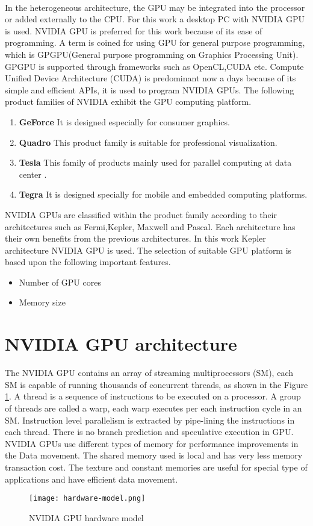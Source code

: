 \paragraph*{} In the heterogeneous architecture, the GPU may be integrated into the processor or added externally to the CPU. For this work a desktop PC with NVIDIA GPU is used. NVIDIA GPU is preferred for this work because of its ease of programming. A term is coined for using GPU for general purpose programming, which is GPGPU(General purpose programming on Graphics Processing Unit). GPGPU is supported through frameworks such as OpenCL,CUDA etc. Compute Unified Device Architecture (CUDA) is predominant now a days because of its simple and efficient APIs, it is used to program NVIDIA GPUs. The following product families of NVIDIA exhibit the GPU computing platform.
\begin{enumerate} 
\item \textbf{GeForce} \hfill \break It is designed especially for consumer graphics.
\item \textbf{Quadro} \hfill \break This product family is suitable for professional visualization.
\item \textbf{Tesla} \hfill \break This family of products mainly used for parallel computing at data center .
\item \textbf{Tegra} \hfill \break It is designed specially for mobile and embedded computing platforms.
\end{enumerate}
NVIDIA GPUs are classified within the product family according to their architectures such as Fermi,Kepler, Maxwell and Pascal. Each architecture has their own benefits from the previous architectures. In this work Kepler architecture NVIDIA GPU is used. The selection of suitable GPU platform is based upon the following important features.

\begin{itemize}
\item Number of GPU cores
\item Memory size
\end{itemize}

\section{NVIDIA GPU architecture}
The NVIDIA GPU contains an array of streaming multiprocessors (SM), each SM is capable of running thousands of concurrent threads, as shown in the Figure \ref{Figure:1.3}. A thread is a sequence of instructions to be executed on a processor. A group of threads are called a warp, each warp executes per each instruction cycle in an SM. Instruction level parallelism is extracted by pipe-lining the instructions in each thread. There is no branch prediction and speculative execution in GPU. NVIDIA GPUs use different types of memory for performance improvements in the Data movement. The shared memory used is local and has very less memory transaction cost. The texture and constant memories are useful for special type of applications and have efficient data movement.
\begin{figure}[htb]
	\centering
	\texttt{[image: hardware-model.png]}
	\caption{NVIDIA GPU hardware model\cite{hwmodel}}
	\label{Figure:1.3}
\end{figure}
